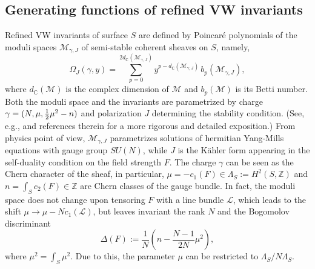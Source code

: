 \documentclass[12pt,letterpaper]{JHEP3}
\def\be{\begin{equation}}
\def\ee{\end{equation}}
\def\hf{{1\over 2}}
\newcommand{\cL}{\mathcal{L}}
\newcommand{\cM}{\mathcal{M}}
\newcommand{\IC}{\mathds{C}}
\newcommand{\IZ}{\mathds{Z}}
\begin{document}
\subsection{Generating functions of refined VW invariants}
\label{subsec-genfunVW}

Refined VW invariants of surface $S$ are defined by Poincar\'e polynomials of the moduli spaces $\cM_{\gamma,J}$
of semi-stable coherent sheaves on $S$, namely,
\be
\Omega_J(\gamma,y)= \sum_{p=0}^{2d_{\IC}(\cM_{\gamma,J})} y^{p-d_{\IC}(\cM_{\gamma,J})}\, b_p(\cM_{\gamma,J}),
\label{intOm}
\ee
where $d_{\IC}(\cM)$ is the complex dimension of $\cM$ and $b_p(\cM)$ is its Betti number.
Both the moduli space and the invariants are parametrized by charge $\gamma=(N,\mu,\hf\mu^2-n)$
and polarization $J$ determining the stability condition. (See, e.g., \cite{Beaujard:2020sgs}
	and references therein for a more rigorous and detailed exposition.)
From physics point of view, $\cM_{\gamma,J}$ parametrizes solutions of hermitian Yang-Mills equations with gauge group $SU(N)$, 
while $J$ is the K\"ahler form appearing in the self-duality condition on the field strength $F$.
The charge $\gamma$ can be seen as the Chern character of the sheaf, in particular, 
$\mu=-c_1(F)\in \Lambda_S:=H^2(S,\IZ)$ and $n=\int_S c_2(F)\in \IZ$ are Chern classes of the gauge bundle.
In fact, the moduli space does not change upon tensoring $F$ with a line bundle $\cL$, 
which leads to the shift $\mu\to \mu-Nc_1(\cL)$, but leaves invariant the rank $N$ and
the Bogomolov discriminant
\be
\Delta(F):= \frac{1}{N} \left( n - \frac{N-1}{2N} \mu^2 \right),
\label{Bogom}
\ee
where $\mu^2= \int_S\mu^2$.
Due to this, the parameter $\mu$ can be restricted to $\Lambda_S/N\Lambda_S$.
\end{document}
